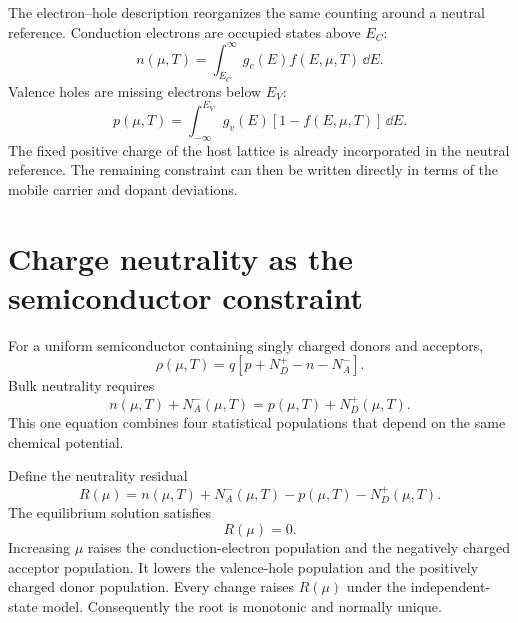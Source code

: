 The electron--hole description reorganizes the same counting around a neutral
reference.  Conduction electrons are occupied states above $E_C$:
\begin{equation}
  n(\mu,T)
  =\int_{E_C}^{\infty}g_c(E)f(E,\mu,T)\,\dd E.
  \label{eq:chemical-potential-conduction-electrons}
\end{equation}
Valence holes are missing electrons below $E_V$:
\begin{equation}
  p(\mu,T)
  =\int_{-\infty}^{E_V}g_v(E)[1-f(E,\mu,T)]\,\dd E.
  \label{eq:chemical-potential-valence-holes}
\end{equation}
The fixed positive charge of the host lattice is already incorporated in the
neutral reference.  The remaining constraint can then be written directly in
terms of the mobile carrier and dopant deviations.

\section{Charge neutrality as the semiconductor constraint}

For a uniform semiconductor containing singly charged donors and acceptors,
\begin{equation}
  \rho(\mu,T)
  =q\left[p+N_D^+-n-N_A^-\right].
  \label{eq:chemical-potential-charge-density}
\end{equation}
Bulk neutrality requires
\begin{equation}
  \boxed{
  n(\mu,T)+N_A^-(\mu,T)
  =p(\mu,T)+N_D^+(\mu,T).
  }
  \label{eq:chemical-potential-neutrality-closure}
\end{equation}
This one equation combines four statistical populations that depend on the
same chemical potential.

Define the neutrality residual
\begin{equation}
  R(\mu)
  =n(\mu,T)+N_A^-(\mu,T)
   -p(\mu,T)-N_D^+(\mu,T).
  \label{eq:chemical-potential-neutrality-residual}
\end{equation}
The equilibrium solution satisfies
\begin{equation}
  R(\mu)=0.
  \label{eq:chemical-potential-root-equation}
\end{equation}
Increasing $\mu$ raises the conduction-electron population and the negatively
charged acceptor population.  It lowers the valence-hole population and the
positively charged donor population.  Every change raises $R(\mu)$ under the
independent-state model.
Consequently the root is monotonic and normally unique.

